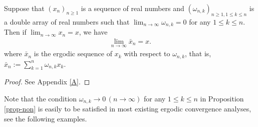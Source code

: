 \documentclass[twoside,11pt]{article}
\begin{document}
\begin{proposition}\label{prop-non}
Suppose that $(x_{n})_{n\geq 1}$ is a sequence of real numbers and $(\omega_{n,k})_{n\geq 1, 1\leq k\leq n}$ is a double array of real numbers such that $\lim_{n\to\infty}\omega_{n,k}=0$ for any $1\leq k\leq n$. Then if $\lim_{n\to\infty}x_{n}=x$, we have 
\begin{align*}
	\lim_{n\to\infty}
	\bar{x}_{n}
	=x.
\end{align*}
where $\bar{x}_{n}$ is the ergodic sequence of $x_{k}$ with respect to $\omega_{n,k}$, that is, $\bar{x}_{n}:=\sum_{k=1}^{n}\omega_{n,k}x_{k}$.
\end{proposition}
\begin{proof}
See Appendix \ref{A}.
\end{proof}
\par Note that the condition $\omega_{n,k}\to 0\,(n\to\infty)$ for any $1\leq k\leq n$ in Proposition \ref{prop-non} is easily to be satisfied in most existing ergodic convergence analyses, see the following examples.
\end{document}
